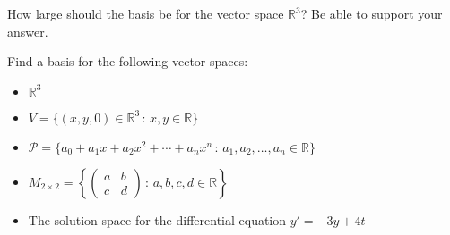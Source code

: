 \begin{problem}
    How large should the basis be for the vector space $\mathbb{R}^3$?  Be able to support
    your answer.
\end{problem}



\begin{problem}
    Find a basis for the following vector spaces:
    \begin{itemize}
        \item $\mathbb{R}^3$
        \item $V = \{ (x,y,0) \in \mathbb{R}^3 \, : \, x,y \in \mathbb{R} \}$
        \item $\mathcal{P} = \{a_0 + a_1 x + a_2 x^2 + \cdots + a_n x^n \, : \, a_1,
                a_2, \ldots, a_n \in \mathbb{R} \}$
        \item $M_{2\times2} = \left\{ \begin{pmatrix} a & b \\ c & d \end{pmatrix} \, : \,
            a,b,c,d \in \mathbb{R} \right\}$
        \item The solution space for the differential equation $y' = -3y + 4t$
    \end{itemize}
\end{problem}

